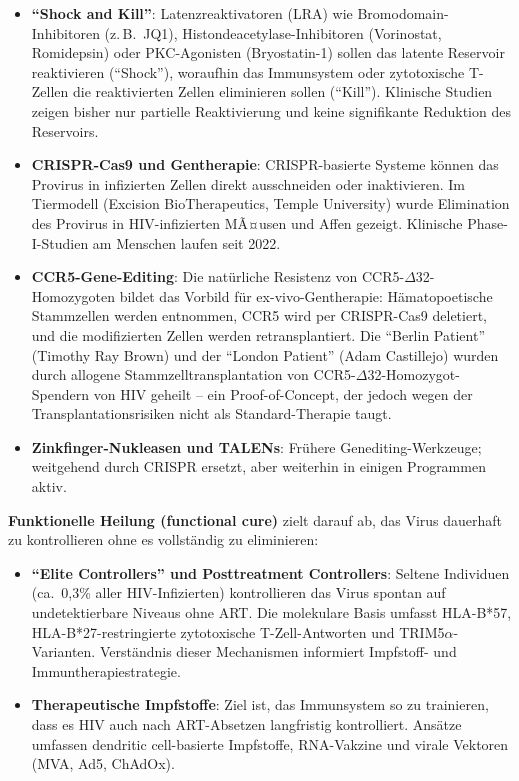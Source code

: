 ﻿\documentclass[a4paper,12pt]{article}
\theoremstyle{definition}
\begin{document}
\begin{itemize}
\item \textbf{``Shock and Kill''}: Latenzreaktivatoren (LRA) wie Bromodomain-Inhibitoren
      (z.\,B.\ JQ1), Histondeacetylase-Inhibitoren (Vorinostat, Romidepsin) oder
      PKC-Agonisten (Bryostatin-1) sollen das latente Reservoir reaktivieren
      (``Shock''), woraufhin das Immunsystem oder zytotoxische T-Zellen die reaktivierten
      Zellen eliminieren sollen (``Kill''). Klinische Studien zeigen bisher nur partielle
      Reaktivierung und keine signifikante Reduktion des Reservoirs.

\item \textbf{CRISPR-Cas9 und Gentherapie}: CRISPR-basierte Systeme k\"onnen das Provirus
      in infizierten Zellen direkt ausschneiden oder inaktivieren. Im Tiermodell
      (Excision BioTherapeutics, Temple University) wurde Elimination des Provirus in
      HIV-infizierten MÃ¤usen und Affen gezeigt. Klinische Phase-I-Studien am Menschen
      laufen seit 2022.

\item \textbf{CCR5-Gene-Editing}: Die nat\"urliche Resistenz von CCR5-$\Delta$32-Homozygoten
      bildet das Vorbild f\"ur ex-vivo-Gentherapie: H\"amatopoetische Stammzellen werden
      entnommen, CCR5 wird per CRISPR-Cas9 deletiert, und die modifizierten Zellen
      werden retransplantiert. Die ``Berlin Patient'' (Timothy Ray Brown) und der
      ``London Patient'' (Adam Castillejo) wurden durch allogene Stammzelltransplantation
      von CCR5-$\Delta$32-Homozygot-Spendern von HIV geheilt -- ein Proof-of-Concept,
      der jedoch wegen der Transplantationsrisiken nicht als Standard-Therapie taugt.

\item \textbf{Zinkfinger-Nukleasen und TALENs}: Fr\"uhere Genediting-Werkzeuge;
      weitgehend durch CRISPR ersetzt, aber weiterhin in einigen Programmen aktiv.
\end{itemize}

\textbf{Funktionelle Heilung (functional cure)} zielt darauf ab, das Virus dauerhaft
zu kontrollieren ohne es vollst\"andig zu eliminieren:

\begin{itemize}
\item \textbf{``Elite Controllers'' und Posttreatment Controllers}: Seltene Individuen
      (ca.\ 0{,}3\% aller HIV-Infizierten) kontrollieren das Virus spontan auf
      undetektierbare Niveaus ohne ART. Die molekulare Basis umfasst HLA-B*57,
      HLA-B*27-restringierte zytotoxische T-Zell-Antworten und TRIM5$\alpha$-Varianten.
      Verst\"andnis dieser Mechanismen informiert Impfstoff- und Immuntherapiestrategie.

\item \textbf{Therapeutische Impfstoffe}: Ziel ist, das Immunsystem so zu trainieren,
      dass es HIV auch nach ART-Absetzen langfristig kontrolliert.
      Ans\"atze umfassen dendritic cell-basierte Impfstoffe, RNA-Vakzine und
      virale Vektoren (MVA, Ad5, ChAdOx).
\end{itemize}
\end{document}

